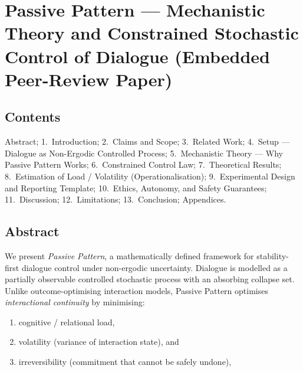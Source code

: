 
\section{Passive Pattern --- Mechanistic Theory and Constrained
Stochastic Control of Dialogue (Embedded Peer-Review Paper)}
\label{sec:passive-pattern-paper}


\subsection{Contents}
\label{sec:pp-contents}

Abstract; 1.~Introduction; 2.~Claims and Scope; 3.~Related Work;
4.~Setup --- Dialogue as Non-Ergodic Controlled Process;
5.~Mechanistic Theory --- Why Passive Pattern Works;
6.~Constrained Control Law; 7.~Theoretical Results;
8.~Estimation of Load / Volatility (Operationalisation);
9.~Experimental Design and Reporting Template;
10.~Ethics, Autonomy, and Safety Guarantees; 11.~Discussion;
12.~Limitations; 13.~Conclusion; Appendices.

\subsection*{Abstract}

We present \emph{Passive Pattern}, a mathematically defined
framework for stability-first dialogue control under non-ergodic
uncertainty. Dialogue is modelled as a partially observable
controlled stochastic process with an absorbing collapse set. Unlike
outcome-optimising interaction models, Passive Pattern optimises
\emph{interactional continuity} by minimising:

\begin{enumerate}
\item cognitive / relational load,
\item volatility (variance of interaction state), and
\item irreversibility (commitment that cannot be safely undone),
\end{enumerate}

